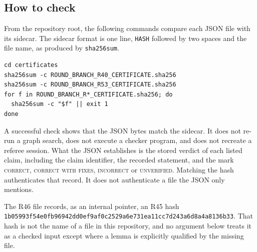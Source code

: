 \documentclass[11pt]{amsart}
\theoremstyle{definition}
\theoremstyle{remark}
\begin{document}
\subsection*{How to check}
From the repository root, the following commands compare each JSON file with its sidecar. The sidecar format is one line, \texttt{HASH} followed by two spaces and the file name, as produced by \texttt{sha256sum}.
\begin{verbatim}
cd certificates
sha256sum -c ROUND_BRANCH_R40_CERTIFICATE.sha256
sha256sum -c ROUND_BRANCH_R53_CERTIFICATE.sha256
for f in ROUND_BRANCH_R*_CERTIFICATE.sha256; do
  sha256sum -c "$f" || exit 1
done
\end{verbatim}
A successful check shows that the JSON bytes match the sidecar. It does not re-run a graph search, does not execute a checker program, and does not recreate a referee session. What the JSON establishes is the stored verdict of each listed claim, including the claim identifier, the recorded statement, and the mark \textsc{correct}, \textsc{correct with fixes}, \textsc{incorrect} or \textsc{unverified}. Matching the hash authenticates that record. It does not authenticate a file the JSON only mentions.

The R46 file records, as an internal pointer, an R45 hash
\texttt{1b05993f54e0fb96942dd0ef9af0c2529a6e731ea11cc7d243a6d8a4a8136b33}.
That hash is not the name of a file in this repository, and no argument below treats it as a checked input except where a lemma is explicitly qualified by the missing file.
\end{document}
